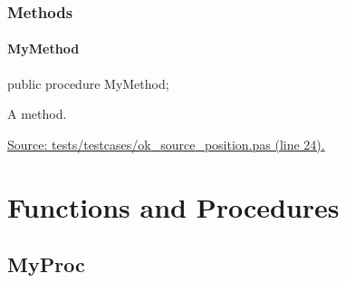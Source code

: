 \documentclass{report}
\newif\ifpdf
\begin{document}
\subsubsection*{\large{\textbf{Methods}}\normalsize\hspace{1ex}\hfill}
\paragraph*{MyMethod}\hspace*{\fill}

\label{ok_source_position.TMyClass-MyMethod}
\begin{list}{}{
\setlength{\itemindent}{0cm}
\setlength{\listparindent}{0cm}
\setlength{\leftmargin}{\evensidemargin}
\addtolength{\leftmargin}{\tmplength}
\settowidth{\labelsep}{X}
\addtolength{\leftmargin}{\labelsep}
\setlength{\labelwidth}{\tmplength}
}
\item[\textbf{Declaration}\hfill]
\ifpdf
\begin{flushleft}
\fi
\begin{ttfamily}
public procedure MyMethod;\end{ttfamily}

\ifpdf
\end{flushleft}
\fi

\par
\item[\textbf{Description}]
A method.\par
\href{https://github.com/pasdoc/pasdoc/blob/master/tests/testcases/ok_source_position.pas#L24}{Source: tests/testcases/ok{\_}source{\_}position.pas (line 24).}

\end{list}
\section{Functions and Procedures}
\ifpdf
\subsection*{\large{\textbf{MyProc}}\normalsize\hspace{1ex}\hrulefill}
\else
\end{document}
